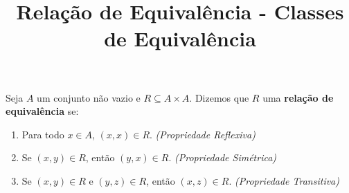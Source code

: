 \documentclass{beamer}
\title{Rela\c{c}\~ao de Equival\^encia - Classes de Equivalência}
\author[\autor]{\autor}
\institute[\instituto]{\instituto}
\date{}
\begin{document}
    \begin{frame}
        \maketitle
    \end{frame}


    \begin{frame}
        \begin{definicao}
            Seja $A$ um conjunto n{\~a}o vazio \pause e $R\subseteq A \times A$. \pause Dizemos que $R$  uma \textbf{rela{\c c}{\~a}o de equival{\^e}ncia} se:\pause
            \begin{enumerate}[label={\roman*})]
                \item Para todo $x \in A$, \pause $(x,x) \in R$. \pause \textit{(Propriedade Reflexiva)}\pause\vspace{.2cm}

                \item Se $(x, y) \in R$, \pause ent\~ao $(y, x) \in R$. \pause \textit{(Propriedade Sim\'etrica)}\pause\vspace{.2cm}

                \item Se $(x, y) \in R$ \pause e $(y, z) \in R$, \pause ent\~ao $(x, z)\in R$. \pause \textit{(Propriedade Transitiva)}\pause
            \end{enumerate}
        \end{definicao}
    \end{frame}
\end{document}
